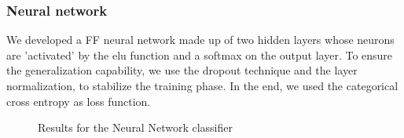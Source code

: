\subsubsection{Neural network}
We developed a FF neural network made up of two hidden layers whose neurons are 'activated' by the elu function and a softmax on the output layer. To ensure the generalization capability, we use the dropout technique and the layer normalization, to stabilize the training phase. In the end, we used the categorical cross entropy as loss function.
\begin{figure}[H]
    \centering
    \caption{Results for the Neural Network classifier}
    \label{fig:NNResults}
\end{figure}

